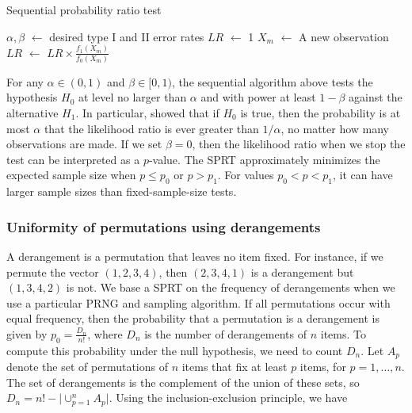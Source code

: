 \documentclass[12pt]{article}
\newcommand*\Let[2]{\State #1 $\gets$ #2}
\begin{document}
\begin{algorithm}[H]                      %
\caption{Sequential probability ratio test}          %
\label{algo:sprt}                           %
\begin{algorithmic}[1]             %
\Let{$\alpha, \beta$}{desired type I and II error rates}
\Let{$LR$}{1}
     \Let{$X_m$}{A new observation}
     \Let{$LR$}{$LR \times \frac{f_1(X_m)}{f_0(X_m)}$}
\EndWhile
{}
\EndIf
{}
\EndIf
\end{algorithmic}  
\end{algorithm}

For any $\alpha \in (0, 1)$ and $\beta \in [0, 1)$, the sequential algorithm above tests the hypothesis $H_0$ at level no larger than $\alpha$ and with power at least $1-\beta$ against the alternative $H_1$.
In particular, \citet{wald_sequential_1947} showed that if $H_0$ is true, then the probability is at most $\alpha$ that the likelihood ratio is ever greater than $1/\alpha$, no matter how many observations are made. If we set $\beta = 0$, then the likelihood ratio when we stop the test can be interpreted as a $p$-value.
The SPRT approximately minimizes the expected sample size when $p \le p_0$ or $p > p_1$. For values $p_0 < p < p_1$, it can have larger sample sizes than fixed-sample-size tests.

\subsubsection{Uniformity of permutations using derangements}
A derangement is a permutation that leaves no item fixed. 
For instance, if we permute the vector $(1, 2, 3, 4)$, then $(2, 3, 4, 1)$ is a derangement but $(1, 3, 4, 2)$ is not. 
We base a SPRT on the frequency of derangements when we use a particular PRNG and sampling algorithm. 
If all permutations occur with equal frequency, then the probability that a permutation is a derangement is given by $p_0 = \frac{D_n}{n!}$, where $D_n$ is the number of derangements of $n$ items. 
To compute this probability under the null hypothesis, we need to count $D_n$.
Let $A_p$ denote the set of permutations of $n$ items that fix at least $p$ items, for $p=1,\dots,n$. 
The set of derangements is the complement of the union of these sets, so $D_n = n! - \lvert \cup_{p=1}^n A_p \rvert$. 
Using the inclusion-exclusion principle, we have
\end{document}
